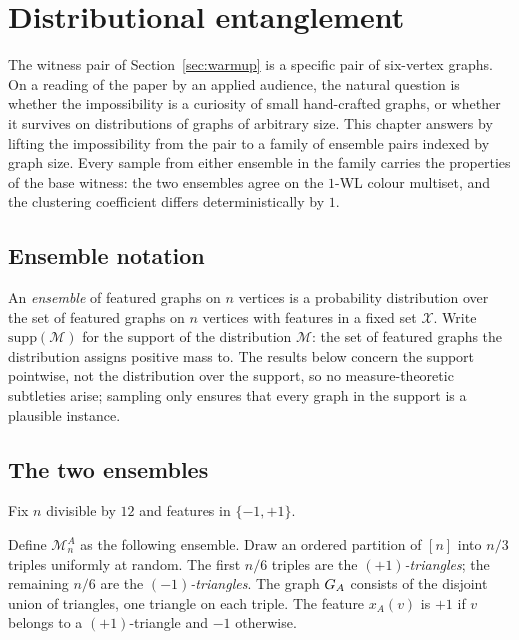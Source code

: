 
\section{Distributional entanglement}\label{sec:entanglement}

The witness pair of Section~\ref{sec:warmup} is a specific pair of six-vertex
graphs. On a reading of the paper by an applied audience, the natural
question is whether the impossibility is a curiosity of small hand-crafted
graphs, or whether it survives on distributions of graphs of arbitrary
size. This chapter answers by lifting the impossibility from the pair to
a family of ensemble pairs indexed by graph size. Every sample from
either ensemble in the family carries the properties of the base
witness: the two ensembles agree on the $1$-WL colour multiset, and the
clustering coefficient differs deterministically by $1$.

\subsection{Ensemble notation}

An \emph{ensemble} of featured graphs on $n$ vertices is a probability
distribution over the set of featured graphs on $n$ vertices with
features in a fixed set $\mathcal{X}$. Write $\mathrm{supp}(\mathcal{M})$
for the support of the distribution $\mathcal{M}$: the set of featured
graphs the distribution assigns positive mass to. The results below
concern the support pointwise, not the distribution over the support,
so no measure-theoretic subtleties arise; sampling only ensures that
every graph in the support is a plausible instance.

\subsection{The two ensembles}\label{sec:two-ensembles}

Fix $n$ divisible by $12$ and features in $\{-1, +1\}$.

Define $\mathcal{M}_n^A$ as the following ensemble. Draw an ordered
partition of $[n]$ into $n/3$ triples uniformly at random. The first
$n/6$ triples are the \emph{$(+1)$-triangles}; the remaining $n/6$ are
the \emph{$(-1)$-triangles}. The graph $G_A$ consists of the
disjoint union of triangles, one triangle on each triple. The feature
$x_A(v)$ is $+1$ if $v$ belongs to a $(+1)$-triangle and $-1$
otherwise.

